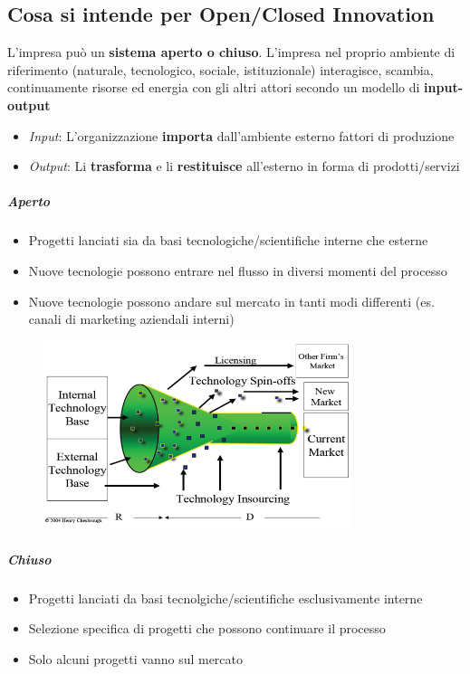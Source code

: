 \documentclass[12pt]{article}
\begin{document}
\subsection{Cosa si intende per Open/Closed Innovation}
L'impresa può un \textbf{sistema aperto o chiuso}.
L’impresa nel proprio ambiente di riferimento (naturale, tecnologico, sociale, istituzionale) interagisce, scambia, continuamente risorse ed energia con gli altri attori secondo un modello di \textbf{input-output}
\begin{itemize}
    \item \textit{Input}: L’organizzazione \textbf{importa} dall’ambiente esterno fattori di produzione
    \item \textit{Output}: Li \textbf{trasforma} e li \textbf{restituisce} all’esterno in forma di prodotti/servizi
\end{itemize}
\subparagraph{Aperto}
\begin{itemize}
    \item Progetti lanciati sia da basi tecnologiche/scientifiche interne che esterne
    \item Nuove tecnologie possono entrare nel flusso in diversi momenti del processo
    \item Nuove tecnologie possono andare sul mercato in tanti modi differenti (es. canali di marketing aziendali interni)
\end{itemize}
\FloatBarrier
\begin{figure}[!htb]
    \centering
    \includegraphics[width=0.8\textwidth]{images/open.png}
\end{figure}
\FloatBarrier
\subparagraph{Chiuso}
\begin{itemize}
    \item Progetti lanciati da basi tecnolgiche/scientifiche esclusivamente interne
    \item Selezione specifica di progetti che possono continuare il processo
    \item Solo alcuni progetti vanno sul mercato
\end{itemize}
\end{document}
